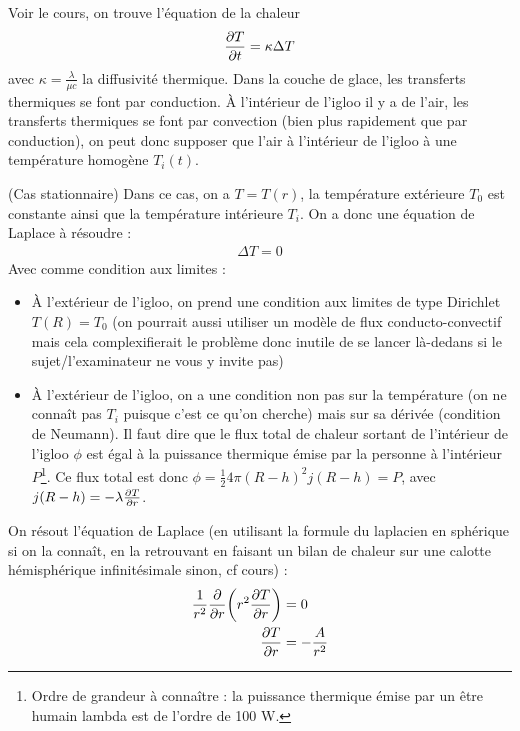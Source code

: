 \begin{solution}
\begin{questions}
    \question Voir le cours, on trouve l'équation de la chaleur
    \begin{align*}
        \pdv{T}{t} = \kappa \Delta T
    \end{align*}
    avec $\kappa = \frac{\lambda}{\mu c}$ la diffusivité thermique. Dans la couche de glace, les transferts thermiques se font par conduction. À l'intérieur de l'igloo il y a de l'air, les transferts thermiques se font par convection (bien plus rapidement que par conduction), on peut donc supposer que l'air à l'intérieur de l'igloo à une température homogène $T_i(t)$.
    
    \question (\textsf{Cas stationnaire}) Dans ce cas, on a $T = T(r)$, la température extérieure $T_0$ est constante ainsi que la température intérieure $T_i$. On a donc une équation de Laplace à résoudre : 
    \begin{align*}
        \Delta T = 0
    \end{align*}
    Avec comme condition aux limites :
    \begin{itemize}
        \item À l'extérieur de l'igloo, on prend une condition aux limites de type Dirichlet $T(R) = T_0$ (on pourrait aussi utiliser un modèle de flux conducto-convectif mais cela complexifierait le problème donc inutile de se lancer là-dedans si le sujet/l'examinateur ne vous y invite pas)
        \item À l'extérieur de l'igloo, on a une condition non pas sur la température (on ne connaît pas $T_i$ puisque c'est ce qu'on cherche) mais sur sa dérivée (condition de Neumann). Il faut dire que le flux total de chaleur sortant de l'intérieur de l'igloo $\phi$ est égal à la puissance thermique émise par la personne à l'intérieur $P$\footnote{Ordre de grandeur à connaître : la puissance thermique émise par un être humain lambda est de l'ordre de 100 W.}. Ce flux total est donc $\phi = \frac12 4\pi (R-h)^2 j(R-h) = P$, avec $j(R-h) = -\lambda \pdv{T}{r}(R-h)$.
    \end{itemize}
    On résout l'équation de Laplace (en utilisant la formule du laplacien en sphérique si on la connaît, en la retrouvant en faisant un bilan de chaleur sur une calotte hémisphérique infinitésimale sinon, cf cours) :
    \begin{align*}
         \frac1{r^2} \pdv{r}\qty(r^2\pdv{T}{r}) &= 0 \\
         \pdv{T}{r} &= -\frac{A}{r^2} \\

\end{align*}
\end{questions}
\end{solution}
